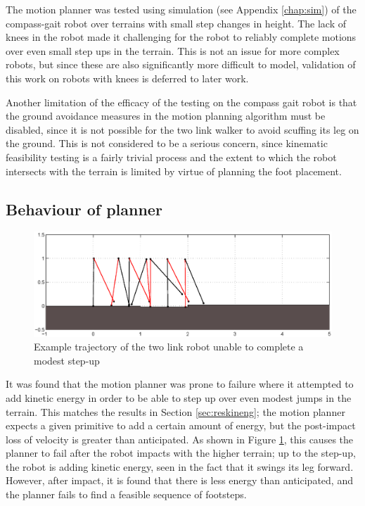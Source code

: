 The motion planner was tested using simulation (see Appendix \ref{chap:sim}) of the compass-gait robot over terrains with small step changes in height. The lack of knees in the robot made it challenging for the robot to reliably complete motions over even small step ups in the terrain. This is not an issue for more complex robots, but since these are also significantly more difficult to model, validation of this work on robots with knees is deferred to later work.

Another limitation of the efficacy of the testing on the compass gait robot is that the ground avoidance measures in the motion planning algorithm must be disabled, since it is not possible for the two link walker to avoid scuffing its leg on the ground. This is not considered to be a serious concern, since kinematic feasibility testing is a fairly trivial process and the extent to which the robot intersects with the terrain is limited by virtue of planning the foot placement.

\subsection{Behaviour of planner}
\begin{figure}
\centering
\includegraphics[width=\linewidth]{7Results/stepupfault}
\caption{Example trajectory of the two link robot unable to complete a modest step-up}
\label{fig:stepupfault}
\end{figure}

It was found that the motion planner was prone to failure where it attempted to add kinetic energy in order to be able to step up over even modest jumps in the terrain. This matches the results in Section \ref{sec:reskineng}; the motion planner expects a given primitive to add a certain amount of energy, but the post-impact loss of velocity is greater than anticipated. As shown in Figure \ref{fig:stepupfault}, this causes the planner to fail after the robot impacts with the higher terrain; up to the step-up, the robot is adding kinetic energy, seen in the fact that it swings its leg forward. However, after impact, it is found that there is less energy than anticipated, and the planner fails to find a feasible sequence of footsteps.

